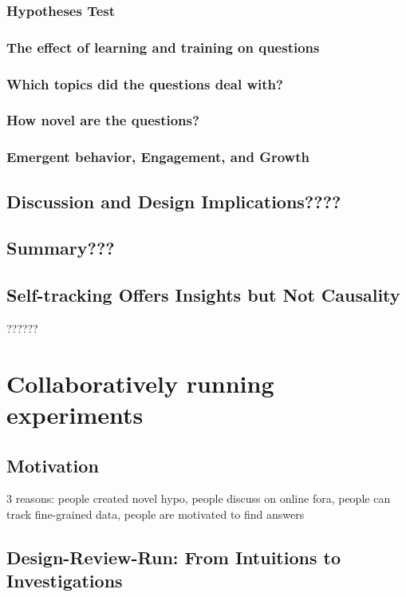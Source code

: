  \subsection{Hypotheses Test}
 \subsection{The effect of learning and training on questions}
 \subsection{Which topics did the questions deal with?}
 \subsection{How novel are the questions?}
 \subsection{Emergent behavior, Engagement, and Growth}

\section{Discussion and Design Implications????}
\section{Summary???}

\section{Self-tracking Offers Insights but Not Causality}
??????

\chapter{Collaboratively running experiments}

\section{Motivation}
3 reasons: people created novel hypo, people discuss on online fora, people can track fine-grained data, people are motivated to find answers


\section{Design-Review-Run: From Intuitions to Investigations}
